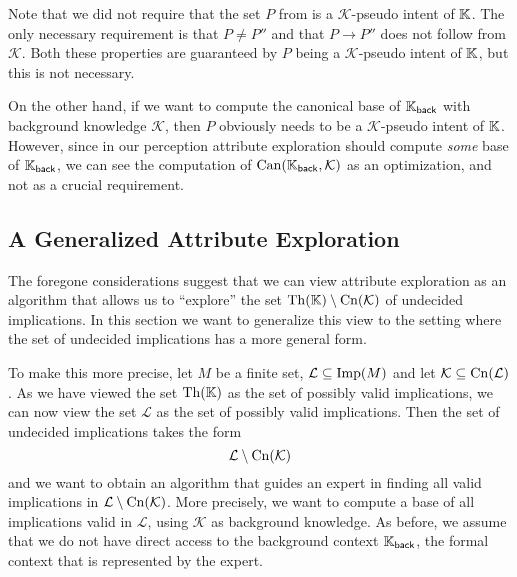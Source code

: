 Note that we did not require that the set $P$ from  is a $\mathcal{K}$-pseudo
intent of ${\mathbb{K}}$.  The only necessary requirement is that $P \neq P''$ and that $P \to
P''$ does not follow from $\mathcal{K}$.  Both these properties are guaranteed by $P$
being a $\mathcal{K}$-pseudo intent of ${\mathbb{K}}$, but this is not necessary.

On the other hand, if we want to compute the canonical base of ${\mathbb{K}}_{\mathsf{back}}$
with background knowledge $\mathcal{K}$, then $P$ obviously needs to be a
$\mathcal{K}$-pseudo intent of ${\mathbb{K}}$.  However, since in our perception attribute
exploration should compute \emph{some} base of ${\mathbb{K}}_{\mathsf{back}}$, we can see the
computation of $\operatorname{Can}({\mathbb{K}}_{\mathsf{back}}, \mathcal{K})$ as an optimization, and not as
a crucial requirement.

\subsection{A Generalized Attribute Exploration}
\label{sec:gener-attr-expl}

The foregone considerations suggest that we can view attribute exploration as an algorithm
that allows us to ``explore'' the set $\operatorname{Th}({\mathbb{K}}) \setminus \operatorname{Cn}(\mathcal{K})$ of
undecided implications.  In this section we want to generalize this view to the setting
where the set of undecided implications has a more general form.

To make this more precise, let $M$ be a finite set, $\mathcal{L} \subseteq \operatorname{Imp}(M)$ and
let $\mathcal{K} \subseteq \operatorname{Cn}(\mathcal{L})$.  As we have viewed the set $\operatorname{Th}({\mathbb{K}})$ as
the set of possibly valid implications, we can now view the set $\mathcal{L}$ as the set
of possibly valid implications.  Then the set of undecided implications takes the form
\begin{equation*}
  \mathcal{L} \setminus \operatorname{Cn}(\mathcal{K})
\end{equation*}
and we want to obtain an algorithm that guides an expert in finding all valid implications
in $\mathcal{L} \setminus \operatorname{Cn}(\mathcal{K})$.  More precisely, we want to compute a base of
all implications valid in $\mathcal{L}$, using $\mathcal{K}$ as background knowledge.  As
before, we assume that we do not have direct access to the background context ${\mathbb{K}}_{\mathsf{back}}$, the formal context that is represented by the expert.

